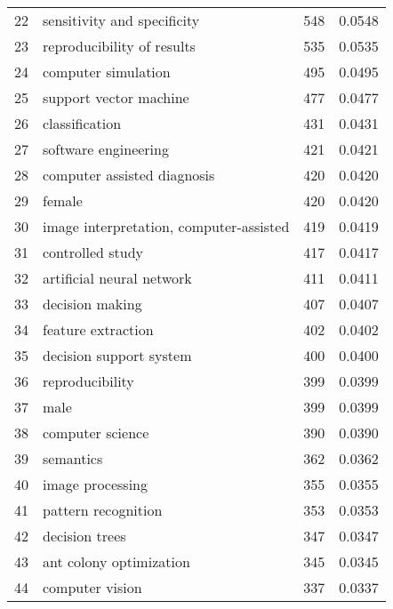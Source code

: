 \begin{tabular}{llrr}
22 &              sensitivity and specificity &         548 &      0.0548 \\
23 &               reproducibility of results &         535 &      0.0535 \\
24 &                      computer simulation &         495 &      0.0495 \\
25 &                   support vector machine &         477 &      0.0477 \\
26 &                           classification &         431 &      0.0431 \\
27 &                     software engineering &         421 &      0.0421 \\
28 &              computer assisted diagnosis &         420 &      0.0420 \\
29 &                                   female &         420 &      0.0420 \\
30 &  image interpretation, computer-assisted &         419 &      0.0419 \\
31 &                         controlled study &         417 &      0.0417 \\
32 &                artificial neural network &         411 &      0.0411 \\
33 &                          decision making &         407 &      0.0407 \\
34 &                       feature extraction &         402 &      0.0402 \\
35 &                  decision support system &         400 &      0.0400 \\
36 &                          reproducibility &         399 &      0.0399 \\
37 &                                     male &         399 &      0.0399 \\
38 &                         computer science &         390 &      0.0390 \\
39 &                                semantics &         362 &      0.0362 \\
40 &                         image processing &         355 &      0.0355 \\
41 &                      pattern recognition &         353 &      0.0353 \\
42 &                           decision trees &         347 &      0.0347 \\
43 &                  ant colony optimization &         345 &      0.0345 \\
44 &                          computer vision &         337 &      0.0337 \\

\end{tabular}
